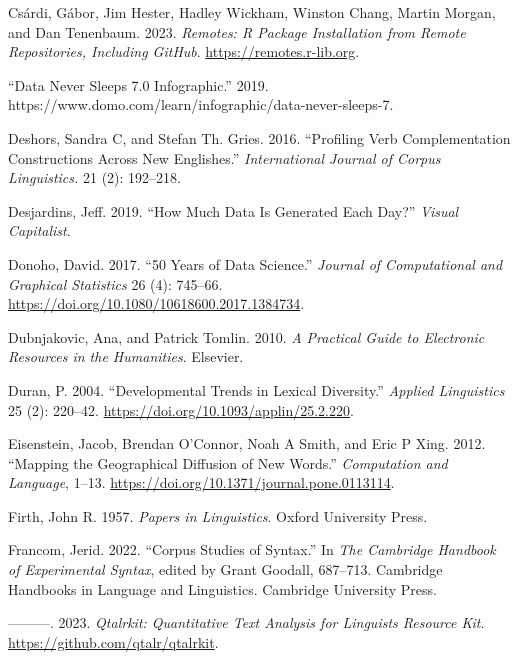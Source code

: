 \documentclass[
  letterpaper,
  DIV=11,
  numbers=noendperiod]{scrreprt}
\newlength{\cslhangindent}
\newenvironment{CSLReferences}[2] %
 {\begin{list}{}{%
  \setlength{\itemindent}{0pt}
  \setlength{\leftmargin}{0pt}
  \setlength{\parsep}{0pt}
  \ifodd #1
   \setlength{\leftmargin}{\cslhangindent}
   \setlength{\itemindent}{-1\cslhangindent}
  \fi
  \setlength{\itemsep}{#2\baselineskip}}}
 {\end{list}}
\theoremstyle{definition}
\theoremstyle{remark}
\begin{document}
\begin{CSLReferences}{1}{0}
Csárdi, Gábor, Jim Hester, Hadley Wickham, Winston Chang, Martin Morgan,
and Dan Tenenbaum. 2023. \emph{Remotes: R Package Installation from
Remote Repositories, Including GitHub}. \url{https://remotes.r-lib.org}.

{``Data Never Sleeps 7.0 Infographic.''} 2019.
https://www.domo.com/learn/infographic/data-never-sleeps-7.

Deshors, Sandra C, and Stefan Th. Gries. 2016. {``Profiling Verb
Complementation Constructions Across New Englishes.''}
\emph{International Journal of Corpus Linguistics.} 21 (2): 192--218.

Desjardins, Jeff. 2019. {``How Much Data Is Generated Each Day?''}
\emph{Visual Capitalist}.

Donoho, David. 2017. {``50 Years of Data Science.''} \emph{Journal of
Computational and Graphical Statistics} 26 (4): 745--66.
\url{https://doi.org/10.1080/10618600.2017.1384734}.

Dubnjakovic, Ana, and Patrick Tomlin. 2010. \emph{A Practical Guide to
Electronic Resources in the Humanities}. Elsevier.

Duran, P. 2004. {``Developmental Trends in Lexical Diversity.''}
\emph{Applied Linguistics} 25 (2): 220--42.
\url{https://doi.org/10.1093/applin/25.2.220}.

Eisenstein, Jacob, Brendan O'Connor, Noah A Smith, and Eric P Xing.
2012. {``Mapping the Geographical Diffusion of New Words.''}
\emph{Computation and Language}, 1--13.
\url{https://doi.org/10.1371/journal.pone.0113114}.

Firth, John R. 1957. \emph{Papers in Linguistics}. Oxford University
Press.

Francom, Jerid. 2022. {``Corpus Studies of Syntax.''} In \emph{The
Cambridge Handbook of Experimental Syntax}, edited by Grant Goodall,
687--713. Cambridge Handbooks in Language and Linguistics. Cambridge
University Press.

---------. 2023. \emph{Qtalrkit: Quantitative Text Analysis for
Linguists Resource Kit}. \url{https://github.com/qtalr/qtalrkit}.


\end{CSLReferences}
\end{document}
